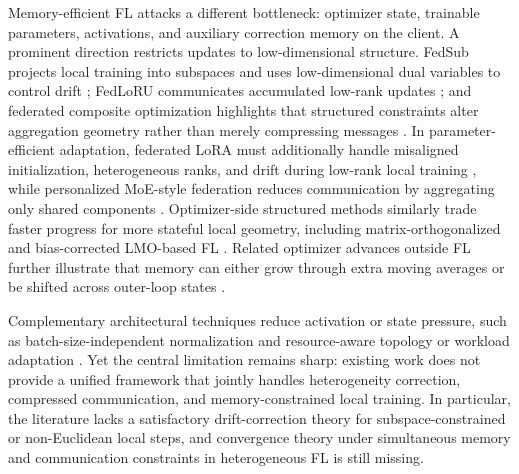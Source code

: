 \documentclass[11pt]{article}
\begin{document}
Memory-efficient FL attacks a different bottleneck: optimizer state, trainable parameters, activations, and auxiliary correction memory on the client. A prominent direction restricts updates to low-dimensional structure. FedSub projects local training into subspaces and uses low-dimensional dual variables to control drift \citep{zhang2025efficient}; FedLoRU communicates accumulated low-rank updates \citep{Park2024CommunicationEfficientFL}; and federated composite optimization highlights that structured constraints alter aggregation geometry rather than merely compressing messages \citep{yuan2020federated}. In parameter-efficient adaptation, federated LoRA must additionally handle misaligned initialization, heterogeneous ranks, and drift during low-rank local training \citep{Zhou2025ILoRAFL}, while personalized MoE-style federation reduces communication by aggregating only shared components \citep{liuflex}. Optimizer-side structured methods similarly trade faster progress for more stateful local geometry, including matrix-orthogonalized and bias-corrected LMO-based FL \citep{liu2025fedmuon, Takezawa2025FedMuonFL}. Related optimizer advances outside FL further illustrate that memory can either grow through extra moving averages or be shifted across outer-loop states \citep{Pagliardini2024TheAO, kallusky2025snoo}. 

Complementary architectural techniques reduce activation or state pressure, such as batch-size-independent normalization and resource-aware topology or workload adaptation \citep{wu2018group, mohammadabadi2024communication, hu2019decentralized, Sato2020NetworkDensityControlledDP, zhou2022defta}. Yet the central limitation remains sharp: existing work does not provide a unified framework that jointly handles heterogeneity correction, compressed communication, and memory-constrained local training. In particular, the literature lacks a satisfactory drift-correction theory for subspace-constrained or non-Euclidean local steps, and convergence theory under simultaneous memory and communication constraints in heterogeneous FL is still missing.



\end{document}
